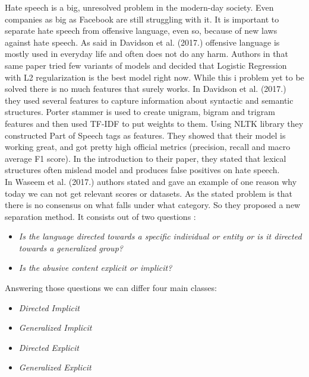 \documentclass[10pt, a4paper]{article}
\begin{document}
Hate speech is a big, unresolved problem in the modern-day society. Even companies as big as Facebook are still struggling with it. It is important to separate hate speech from offensive language, even so, because of new laws against hate speech\citep{Davidson2017AutomatedHS}. As said in Davidson et al. (2017.) offensive language is mostly used in everyday life and often does not do any harm. Authors in that same paper tried few variants of models and decided that Logistic Regression with L2 regularization is the best model right now.
While this i problem yet to be solved there is no much features that surely works. In Davidson et al. (2017.) they used several features to capture information about syntactic and semantic structures. Porter stammer is used to create unigram, bigram and trigram features and then used TF-IDF to put weights to them. Using NLTK library they constructed Part of Speech tags as features. They showed that their model is working great, and got pretty high official metrics (precision, recall and macro average F1 score). In the introduction to their paper, they stated that lexical structures often mislead model and produces false positives on hate speech.\citep{Davidson2017AutomatedHS}
\\In Waseem et al. (2017.) authors stated and gave an example of one reason why today we can not get relevant scores or datasets. As the stated problem is that there is no consensus on what falls under what category. So they proposed a new separation method. It consists out of two questions \citep{WaseemUnderstandingAbuse}:
\begin{itemize}
	\item \textit{Is the language directed towards a specific individual or entity or is it directed towards a generalized group?}
	\item \textit{Is the abusive content explicit or implicit?}
\end{itemize}
Answering those questions we can differ four main classes:
\begin{itemize}
	\item \textit{Directed Implicit}
	\item \textit{Generalized Implicit}
	\item \textit{Directed Explicit}
	\item \textit{Generalized Explicit}
\end{itemize}
\end{document}
